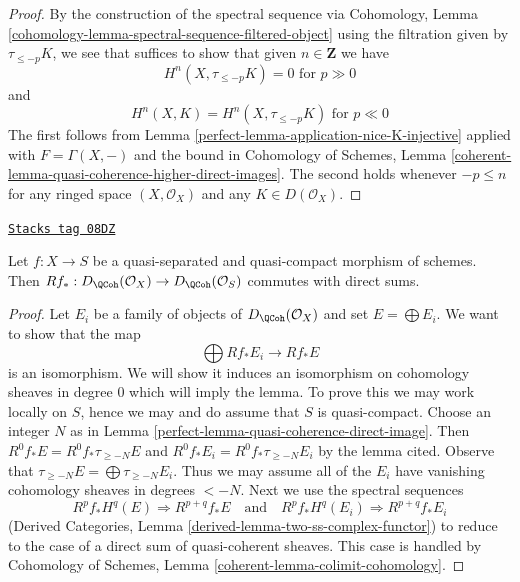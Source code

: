 \begin{proof}

By the construction of the spectral sequence via
Cohomology, Lemma \ref{cohomology-lemma-spectral-sequence-filtered-object}
using the filtration given by $\tau_{\leq -p}K$, we see that
suffices to show that given $n \in \mathbf{Z}$ we have
$$
H^n(X, \tau_{\leq -p}K) = 0 \text{ for } p \gg 0
$$
and
$$
H^n(X, K) = H^n(X, \tau_{\leq -p}K) \text{ for } p \ll 0
$$
The first follows from Lemma \ref{perfect-lemma-application-nice-K-injective}
applied with $F = \Gamma(X, -)$ and the bound in
Cohomology of Schemes, Lemma
\ref{coherent-lemma-quasi-coherence-higher-direct-images}.
The second holds whenever
$-p \leq n$ for any ringed space $(X, \mathcal{O}_X)$ and any
$K \in D(\mathcal{O}_X)$.
\end{proof}

\begin{lemma}
\label{perfect-lemma-quasi-coherence-pushforward-direct-sums}
\href{https://stacks.math.columbia.edu/tag/08DZ}{\texttt{Stacks tag 08DZ}}

Let $f : X \to S$ be a quasi-separated and quasi-compact morphism of
schemes. Then
$Rf_* : D_\QCoh(\mathcal{O}_X) \to D_\QCoh(\mathcal{O}_S)$
commutes with direct sums.
\end{lemma}

\begin{proof}

Let $E_i$ be a family of objects of $D_\QCoh(\mathcal{O}_X)$
and set $E = \bigoplus E_i$. We want to show that the map
$$
\bigoplus Rf_*E_i \longrightarrow Rf_*E
$$
is an isomorphism. We will show it induces an isomorphism on
cohomology sheaves in degree $0$ which will imply the lemma.
To prove this we may work locally on $S$, hence we may and do
assume that $S$ is quasi-compact.
Choose an integer $N$ as in Lemma \ref{perfect-lemma-quasi-coherence-direct-image}.
Then $R^0f_*E = R^0f_*\tau_{\geq -N}E$ and
$R^0f_*E_i = R^0f_*\tau_{\geq -N}E_i$ by the lemma cited. Observe that
$\tau_{\geq -N}E = \bigoplus \tau_{\geq -N}E_i$.
Thus we may assume all of the $E_i$ have vanishing cohomology
sheaves in degrees $< -N$. Next we use the spectral sequences
$$
R^pf_*H^q(E) \Rightarrow R^{p + q}f_*E
\quad\text{and}\quad
R^pf_*H^q(E_i) \Rightarrow R^{p + q}f_*E_i
$$
(Derived Categories, Lemma \ref{derived-lemma-two-ss-complex-functor})
to reduce to the case of a direct sum of quasi-coherent sheaves.
This case is handled by
Cohomology of Schemes, Lemma \ref{coherent-lemma-colimit-cohomology}.
\end{proof}

